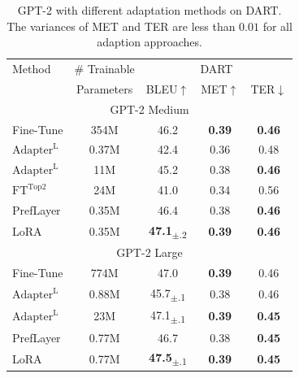 \documentclass{article} %
\begin{document}
\begin{table}[h]
\centering
\begin{tabular}{lc|ccc}
\hline
\toprule
Method & \# Trainable &  \multicolumn{3}{c}{DART} \\ %
       & Parameters & BLEU$\uparrow$ & MET$\uparrow$ & TER$\downarrow$  \\
\midrule
 \multicolumn{5}{c}{GPT-2 Medium}\\
Fine-Tune & 354M & 46.2 & \textbf{0.39} & \textbf{0.46}  \\
$\text{Adapter}^{\text{L}}$ & 0.37M & 42.4 & 0.36 & 0.48 \\
$\text{Adapter}^{\text{L}}$ & 11M & 45.2 & 0.38 & \textbf{0.46} \\
$\text{FT}^{\text{Top2}}$ & 24M & 41.0 & 0.34 & 0.56 \\
PrefLayer & 0.35M & 46.4 & 0.38 & \textbf{0.46}   \\
LoRA  & 0.35M & \textbf{47.1}\textsubscript{$\pm$.2}  & \textbf{0.39} & \textbf{0.46} \\
\midrule
 \multicolumn{5}{c}{GPT-2 Large}\\
Fine-Tune & 774M & 47.0 & \textbf{0.39} & 0.46  \\
$\text{Adapter}^{\text{L}}$ & 0.88M & 45.7\textsubscript{$\pm$.1} & 0.38 & 0.46 \\
$\text{Adapter}^{\text{L}}$ & 23M & 47.1\textsubscript{$\pm$.1} & \textbf{0.39} & \textbf{0.45} \\
PrefLayer & 0.77M & 46.7 & 0.38 & \textbf{0.45} \\
LoRA & 0.77M & \textbf{47.5}\textsubscript{$\pm$.1} & \textbf{0.39} &  \textbf{0.45} \\
\bottomrule
\end{tabular}
\caption{GPT-2 with different adaptation methods on DART. The variances of MET and TER are less than $0.01$ for all adaption approaches. }
\label{tab:gpt2_ft_dart}
\end{table}
\end{document}
